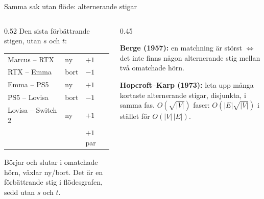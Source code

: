 {\kaninbg
\begin{frame}{\kh Samma sak utan flöde: alternerande stigar}
\begin{columns}[T]
\begin{column}{0.52\textwidth}
\small
Den sista förbättrande stigen, utan $s$ och $t$:\par\smallskip
\footnotesize
\renewcommand{\arraystretch}{1.15}
\begin{tabular}{@{}lll@{}}
Marcus -- RTX & ny & $+1$\\
RTX -- Emma & bort & $-1$\\
Emma -- PS5 & ny & $+1$\\
PS5 -- Lovisa & bort & $-1$\\
Lovisa -- Switch 2 & ny & $+1$\\
\midrule
& & $+1$ par\\
\end{tabular}\par\smallskip
\small
Börjar och slutar i omatchade hörn, växlar ny/bort. Det är en förbättrande stig i
flödesgrafen, sedd utan $s$ och $t$.
\end{column}
\begin{column}{0.45\textwidth}
\begin{kaninbox}[fontupper=\footnotesize]
\textbf{Berge (1957):} en matchning är störst $\iff$ det inte finns någon alternerande stig
mellan två omatchade hörn.
\end{kaninbox}
\begin{kaninbox}[fontupper=\footnotesize]
\textbf{Hopcroft--Karp (1973):} leta upp många kortaste alternerande stigar, disjunkta, i
samma fas. $O(\sqrt{|V|})$ faser: $O(|E|\sqrt{|V|})$ i stället för $O(|V|\,|E|)$.
\end{kaninbox}
\end{column}
\end{columns}
\end{frame}}


